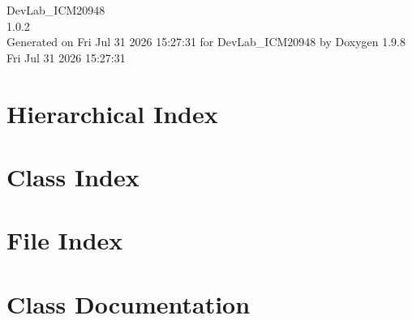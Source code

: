 \documentclass[twoside]{book}
\newcommand{\+}{\discretionary{\mbox{\scriptsize$\hookleftarrow$}}{}{}}
\newcommand{\clearemptydoublepage}{%
    \newpage{\pagestyle{empty}\cleardoublepage}%
  }
\begin{document}
  \raggedbottom
    \hypersetup{pageanchor=false,
                bookmarksnumbered=true,
                pdfencoding=unicode
               }
  \begin{titlepage}
  \vspace*{7cm}
  \begin{center}%
  {\Large Dev\+Lab\+\_\+\+ICM20948}\\
  [1ex]\large 1.\+0.\+2 \\
  \vspace*{1cm}
  {\large Generated on Fri Jul 31 2026 15\+:27\+:31 for Dev\+Lab\+\_\+\+ICM20948 by Doxygen 1.9.8}\\
    \vspace*{0.5cm}
    {\small Fri Jul 31 2026 15:27:31}
  \end{center}
  \end{titlepage}
  \clearemptydoublepage
  \tableofcontents
  \clearemptydoublepage
  \hypersetup{pageanchor=true}

\chapter{Hierarchical Index}

\chapter{Class Index}

\chapter{File Index}

\chapter{Class Documentation}










\end{document}
